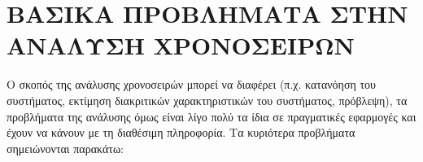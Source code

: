 %

\section{ΒΑΣΙΚΑ ΠΡΟΒΛΗΜΑΤΑ ΣΤΗΝ ΑΝΑΛΥΣΗ ΧΡΟΝΟΣΕΙΡΩΝ}
Ο σκοπός της ανάλυσης χρονοσειρών μπορεί  να διαφέρει (π.χ. κατανόηση
του συστήματος, εκτίμηση διακριτικών χαρακτηριστικών του συστήματος,
πρόβλεψη), τα προβλήματα της ανάλυσης όμως είναι λίγο πολύ τα ίδια σε
πραγματικές εφαρμογές και έχουν να κάνουν με τη διαθέσιμη πληροφορία. Τα
κυριότερα προβλήματα σημειώνονται παρακάτω:

